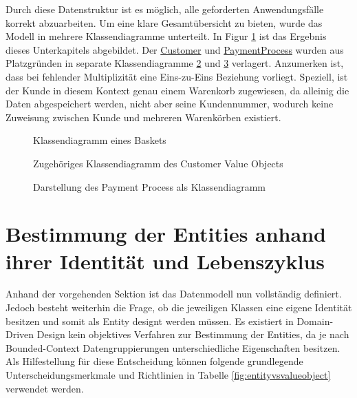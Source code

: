 
Durch diese Datenstruktur ist es möglich, alle geforderten Anwendungsfälle korrekt abzuarbeiten. Um eine klare Gesamtübersicht zu bieten, wurde das Modell in mehrere Klassendiagramme unterteilt. In Figur \ref{fig:VO-Basket} ist das Ergebnis dieses Unterkapitels abgebildet. Der \ul{Customer} und \ul{PaymentProcess} wurden aus Platzgründen in separate Klassendiagramme \ref{fig:VO-Customer} und \ref{fig:VO-Payment} verlagert. Anzumerken ist, dass bei fehlender Multiplizität eine Eins-zu-Eins Beziehung vorliegt. Speziell, ist der Kunde in diesem Kontext genau einem Warenkorb zugewiesen, da alleinig die Daten abgespeichert werden, nicht aber seine Kundennummer, wodurch keine Zuweisung zwischen Kunde und mehreren Warenkörben existiert.


\begin{figure}[htbp]
	\centering
	
	\caption{Klassendiagramm eines Baskets}
	\label{fig:VO-Basket}
\end{figure}

\begin{figure}[htbp]
	\centering
	
	\caption{Zugehöriges Klassendiagramm des Customer Value Objects}
	\label{fig:VO-Customer}
\end{figure}

\begin{figure}[htbp]
	\centering
	
	\caption{Darstellung des Payment Process als Klassendiagramm}
	\label{fig:VO-Payment}
\end{figure}


\section{Bestimmung der Entities anhand ihrer Identität und Lebenszyklus}

Anhand der vorgehenden Sektion ist das Datenmodell nun vollständig definiert. Jedoch besteht weiterhin die Frage, ob die jeweiligen Klassen eine eigene Identität besitzen und somit als Entity designt werden müssen. Es existiert in Domain-Driven Design kein objektives Verfahren zur Bestimmung der Entities, da je nach Bounded-Context Datengruppierungen unterschiedliche Eigenschaften besitzen. Als Hilfestellung für diese Entscheidung können folgende grundlegende Unterscheidungsmerkmale und Richtlinien in Tabelle \ref{fig:entityvsvalueobject} verwendet werden.

